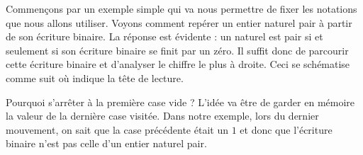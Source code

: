 Commençons par un exemple simple qui va nous permettre de fixer les notations que nous allons utiliser.
Voyons comment repérer un entier naturel pair à partir de son écriture binaire.
La réponse est évidente : un naturel est pair si et seulement si son écriture binaire se finit par un zéro.
Il suffit donc de parcourir cette écriture binaire et d'analyser le chiffre le plus à droite. Ceci se schématise comme suit où \head{} indique la tête de lecture.



\vspace{-1em}

Pourquoi s'arrêter à la première case vide ? L'idée va être de garder en mémoire la valeur de la dernière case visitée.
Dans notre exemple, lors du dernier mouvement, on sait que la case précédente était un $1$ et donc que l'écriture binaire n'est pas celle d'un entier naturel pair.
